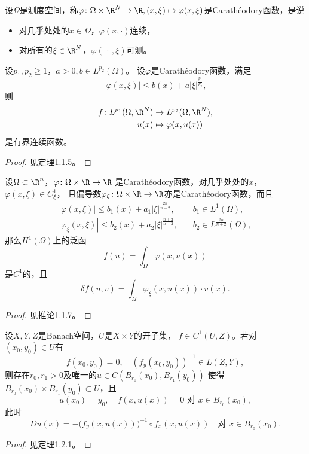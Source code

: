 \begin{definition}
    设$\Omega$是测度空间，称$\varphi\colon\Omega\times\R^N\to\R,
    (x,\xi)\mapsto\varphi(x,\xi)$是Carathéodory函数，是说
    \begin{itemize}
        \item 对几乎处处的$x\in\Omega$，$\varphi(x,\cdot)$连续，
        \item 对所有的$\xi\in\R^N$，$\varphi(\,\cdot\,,\xi)$可测。
    \end{itemize}
\end{definition}
\begin{theorem}\label{continuity}
    设$p_1,p_2\ge1$，$a>0,b\in L^{p_2}(\Omega)$。
    设$\varphi$是Carathéodory函数，满足
    \[|\varphi(x,\xi)|\le b(x)+a|\xi|^\frac{p_1}{p_2},\]
    则
    \begin{align*}
        f\colon L^{p_1}(\Omega,\R^N) &\to L^{p_2}(\Omega,\R^N),\\
        u(x) &\mapsto \varphi(x,u(x))
    \end{align*}
    是有界连续函数。
\end{theorem}
\begin{proof}
    见\cite{Zhang}定理1.1.5。
\end{proof}
\begin{corollary}
    设$\Omega\subset\R^n$，$\varphi\colon\Omega\times\R\to\R$
    是Carathéodory函数，对几乎处处的$x$，$\varphi(x,\xi)\in C_\xi^1$，
    且偏导数$\varphi_\xi\colon\Omega\times\R\to\R$亦是Carathéodory函数，而且
    \begin{align*}
        |\varphi(x,\xi)|\le b_1(x)+a_1|\xi|^\frac{2n}{n-2},
        &\quad b_1\in L^1(\Omega),\\
        |\varphi_\xi(x,\xi)|\le b_2(x)+a_2|\xi|^\frac{n+2}{n-2},
        &\quad b_2\in L^\frac{2n}{n+2}(\Omega),
    \end{align*}
    那么$H^1(\Omega)$上的泛函
    \[f(u)=\int_\Omega\varphi(x,u(x))\]
    是$C^1$的，且
    \[\delta f(u,v)=\int_\Omega\varphi_\xi(x,u(x)) \cdot v(x).\]
\end{corollary}
\begin{proof}
    见\cite{Zhang}推论1.1.7。
\end{proof}
\begin{theorem}[隐函数定理]
    设$X,Y,Z$是Banach空间，$U$是$X \times Y$的开子集，
    $f\in C^1(U,Z)$。若对$(x_0,y_0)\in U$有
    \[f(x_0,y_0)=0,\quad (f_y(x_0,y_0))^{-1}\in L(Z,Y),\]
    则存在$r_0,r_1>0$及唯一的$u \in C(B_{r_0}(x_0),B_{r_1}(y_0))$
    使得$B_{r_0}(x_0) \times B_{r_1}(y_0) \subset U$，且
    \[u(x_0)=y_0,\quad f(x,u(x))=0\text{ 对 }x\in B_{r_0}(x_0),\]
    此时
    \[Du(x)=-\big(f_y(x,u(x))\big)^{-1} \circ f_x(x,u(x))
    \quad\text{对 }x\in B_{r_0}(x_0).\]
\end{theorem}
\begin{proof}
    见\cite{Zhang}定理1.2.1。
\end{proof}
\begin{definition}[Banach流形]\end{definition}

